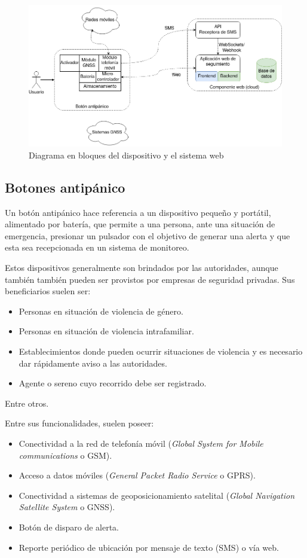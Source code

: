 \begin{figure}[htbp]
	\centering
	\includegraphics[width=.9\textwidth]{./Figures/diagBloques.png}
	\caption{Diagrama en bloques del dispositivo y el sistema web}
	\label{fig:texmaker}
\end{figure}

\subsection{Botones antipánico}

Un botón antipánico hace referencia a un dispositivo pequeño y portátil, alimentado por batería, que permite a una persona, ante una situación de emergencia, presionar un pulsador con el objetivo de generar una alerta y que esta sea recepcionada en un sistema de monitoreo.

Estos dispositivos generalmente son brindados por las autoridades, aunque también también pueden ser provistos por empresas de seguridad privadas. Sus beneficiarios suelen ser:
\begin{itemize}
\item Personas en situación de violencia de género.	
\item Personas en situación de violencia intrafamiliar.
\item Establecimientos donde pueden ocurrir situaciones de violencia y es necesario dar rápidamente aviso a las autoridades.
\item Agente o sereno cuyo recorrido debe ser registrado.
\end{itemize}
Entre otros.

Entre sus funcionalidades, suelen poseer:
\begin{itemize}
\item Conectividad a la red de telefonía móvil (\textit{Global System for Mobile communications} o GSM).
\item Acceso a datos móviles (\textit{General Packet Radio Service} o GPRS).
\item Conectividad a sistemas de geoposicionamiento satelital (\textit{Global Navigation Satellite System} o GNSS).
\item Botón de disparo de alerta.
\item Reporte periódico de ubicación por mensaje de texto (SMS) o vía web.
\end{itemize}

